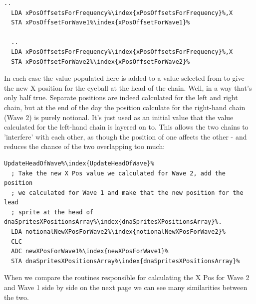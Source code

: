 \begin{lstlisting}[escapechar=\%]
  ..
  LDA xPosOffsetsForFrequency%\index{xPosOffsetsForFrequency}%,X
  STA xPosOffsetForWave1%\index{xPosOffsetForWave1}%

  ..
  LDA xPosOffsetsForFrequency%\index{xPosOffsetsForFrequency}%,X
  STA xPosOffsetForWave2%\index{xPosOffsetForWave2}%
\end{lstlisting}

In each case the value populated here is added to a value selected from  to give the 
new X position for the eyeball at the head of the chain. Well, in a way that's only half true. Separate positions
are indeed calculated for the left and right chain, but at the end of the day the position calculate for the right-hand
chain (Wave 2) is purely notional. It's just used as an initial value that the value calculated for the left-hand chain
is layered on to. This allows the two chains to 'interfere' with each other, as though the position of one affects the
other - and reduces the chance of the two overlapping too much:

\begin{lstlisting}[caption=From \icode{CalculateValueOfNewXPosForWave1},escapechar=\%]
UpdateHeadOfWave%\index{UpdateHeadOfWave}%   
  ; Take the new X Pos value we calculated for Wave 2, add the position
  ; we calculated for Wave 1 and make that the new position for the lead
  ; sprite at the head of dnaSpritesXPositionsArray%\index{dnaSpritesXPositionsArray}%.
  LDA notionalNewXPosForWave2%\index{notionalNewXPosForWave2}%
  CLC
  ADC newXPosForWave1%\index{newXPosForWave1}%
  STA dnaSpritesXPositionsArray%\index{dnaSpritesXPositionsArray}%
\end{lstlisting}

When we compare the routines responsible for calculating the X Pos for Wave 2 and Wave 1 side by side on the next
page we can see many similarities between the two.

